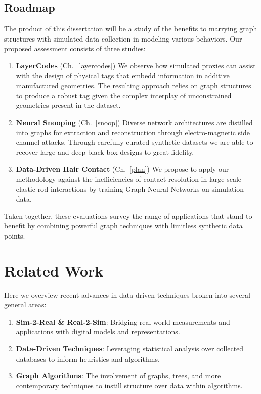 \documentclass[12pt]{report}
\begin{document}
\section{Roadmap}\label{sec:roadmap}
The product of this dissertation will be a study of the benefits to marrying graph structures with
simulated data collection in modeling various behaviors. 
Our proposed assessment consists of three studies:
\begin{enumerate}
    \item \textbf{LayerCodes} (Ch.~\ref{layercodes}) We observe how simulated proxies can assist with the design
    of physical tags that embedd information in additive manufactured geometries.
    The resulting approach relies on graph structures to produce a robust tag given the complex interplay
    of unconstrained geometries present in the dataset.
    \item \textbf{Neural Snooping} (Ch.~\ref{snoop}) Diverse network architectures are distilled into graphs
    for extraction and reconstruction through electro-magnetic side channel attacks. Through carefully
    curated synthetic datasets we are able to recover large and deep black-box designs to great fidelity.
    \item \textbf{Data-Driven Hair Contact} (Ch.~\ref{plan}) We propose to apply our methodology against 
    the inefficiencies of contact resolution in large scale elastic-rod interactions 
    by training Graph Neural Networks on simulation data.
\end{enumerate}
Taken together, these evaluations survey the range of applications that stand to benefit by combining powerful graph techniques with limitless synthetic data points.

\chapter{Related Work}\label{related}

Here we overview recent advances in data-driven techniques broken into several general areas:
\begin{enumerate}
    \item \textbf{Sim-2-Real \& Real-2-Sim}: Bridging 
    real world measurements and applications with digital models and representations. 
    \item \textbf{Data-Driven Techniques}: Leveraging statistical analysis over collected databases to inform heuristics and algorithms.  
    \item \textbf{Graph Algorithms}: The involvement of graphs, trees, and more contemporary techniques to instill structure over data within algorithms.
\end{enumerate}
\end{document}
